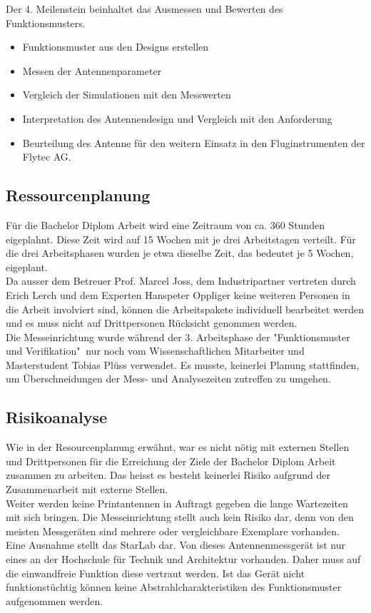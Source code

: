 Der 4. Meilenstein beinhaltet das Ausmessen und Bewerten des Funktionsmusters.
\begin{itemize}
\item Funktionsmuster aus den Designs erstellen
\item Messen der Antennenparameter
\item Vergleich der Simulationen mit den Messwerten
\item Interpretation des Antennendesign und Vergleich mit den Anforderung 
\item Beurteilung des Antenne für den weitern Einsatz in den Fluginstrumenten der Flytec AG. 
\end{itemize}

\subsection{Ressourcenplanung}
Für die Bachelor Diplom Arbeit wird eine Zeitraum von ca. 360 Stunden eigeplahnt. Diese Zeit wird auf 15 Wochen mit je drei Arbeitstagen verteilt. Für die drei Arbeitsphasen wurden je etwa dieselbe Zeit, das bedeutet je 5 Wochen, eigeplant.\\
Da ausser dem Betreuer Prof. Marcel Joss, dem Industripartner vertreten durch Erich Lerch  und dem Experten Hanspeter Oppliger keine weiteren Personen in die Arbeit involviert sind, können die Arbeitspakete individuell bearbeitet werden und es muss nicht auf Drittpersonen Rücksicht genommen werden.\\
Die Messeinrichtung wurde während der 3. Arbeitsphase der "Funktionsmuster und Verifikation" $\ $nur noch vom Wissenschaftlichen Mitarbeiter und Masterstudent Tobias Plüss verwendet. Es musste, keinerlei Planung stattfinden, um  Überschneidungen der Mess- und Analysezeiten zutreffen zu umgehen. 

\subsection{Risikoanalyse}
Wie in der Resourcenplanung erwähnt, war es nicht nötig mit externen Stellen und Drittpersonen für die Erreichung der Ziele der Bachelor Diplom Arbeit zusammen zu arbeiten. Das heisst es besteht keinerlei Risiko aufgrund der Zusammenarbeit mit externe Stellen.\\
Weiter werden keine Printantennen in Auftragt gegeben die lange Wartezeiten mit sich bringen.
Die Messeinrichtung stellt auch kein Risiko dar, denn von den meisten Messgeräten sind mehrere oder vergleichbare Exemplare vorhanden.\\
Eine Ausnahme stellt das StarLab dar. Von dieses Antennenmessgerät ist nur eines an der Hochschule für Technik und Architektur vorhanden. Daher muss auf die einwandfreie Funktion diese vertraut werden. Ist das Gerät nicht funktionstüchtig können keine Abstrahlcharakteristiken des Funktionsmuster aufgenommen werden.

